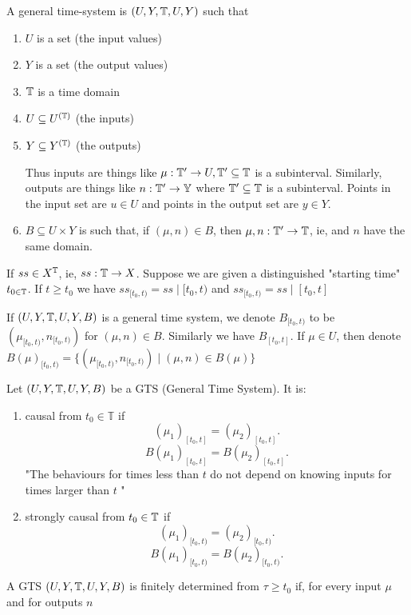 \begin{definition}
	A general time-system is $(U, Y, \mathbb{T}, U, Y)$ such that 
	\begin{enumerate}
		\item $U$ is a set (the input values)
		\item $Y$ is a set (the output values)
		\item $\mathbb{T}$ is a time domain
		\item $U \subseteq U^{(\mathbb{T})}$ (the inputs)
		\item $Y \subseteq Y^{(\mathbb{T})}$ (the outputs)

		Thus inputs are things like $\mu : \mathbb{T}' \to U, \mathbb{T}' \subseteq \mathbb{T}$ is a subinterval. Similarly, outputs are things like $n : \mathbb{T}' \to \mathbb{Y}$ where $\mathbb{T}' \subseteq \mathbb{T}$ is a subinterval. Points in the input set are $u \in  U$ and points in the output set are $y \in Y$. 
	\item $B \subseteq U \times  Y$ is such that, if $(\mu , n) \in  B$, then $\mu, n : \mathbb{T}' \to \mathbb{T}$, ie, \mu and $n$ have the same domain. 

	\end{enumerate}
\end{definition}

\begin{notation}
	If $ss \in X^{\mathbb{T}}$, ie, $ss : \mathbb{T} \to X$. Suppose we are given a distinguished "starting time" $t_{0 \in  \mathbb{T}}$. If $t \ge t_{0}$ we have $ss_{[t_{0}, t)} = ss  \mid [t_{0}, t)$ and $ss_{[t_{0}, t)} = ss  \mid [t_{0}, t]$
\end{notation}


If $(U, Y, \mathbb{T}, U, Y, B)$ is a general time system, we denote $B_{[t_{0}, t)}$ to be $(\mu _{[t_{0}, t)}, n_{[t_{0}, t)})$ for $(\mu , n) \in  B$. Similarly we have $B_{[t_{0}, t]}$. If $\mu \in U$, then denote $B(\mu ) _{[t_{0}, t)} = \{(\mu _{[t_{0}, t)}, n _{[t_{0}, t)})  \mid (\mu , n) \in  B( \mu ) \}$


\begin{definition}
	Let $(U, Y, \mathbb{T}, U, Y, B)$ be a GTS (General Time System). It is:
	\begin{enumerate}
		\item causal from $t_{0} \in  \mathbb{ T}$ if 
			\[
				(\mu _{1})_{[t_{0}, t]} = (\mu _{2})_{[t_{0}, t]}

			.\] \[
				B(\mu _{1})_{[t_{0}, t]} = B(\mu _{2})_{[t_{0}, t]}
			.\] 
			"The behaviours for times less than $t$ do not depend on knowing inputs for times larger than $t$ "
		\item strongly causal from $t_{0} \in  \mathbb{T}$ if 
			\[
				(\mu _{1})_{[t_{0}, t)} = (\mu _{2})_{[t_{0}, t)}

			.\] 
			\[
				B(\mu _{1})_{[t_{0}, t)} = B(\mu _{2})_{[t_{0}, t)}
			.\]
	\end{enumerate}
\end{definition}

\begin{definition}
	A GTS $(U, Y, \mathbb{T}, U, Y, B)$ is finitely determined from $\tau \ge t_{0}$ if, for every input $\mu$ and for outputs $n$
\end{definition}
